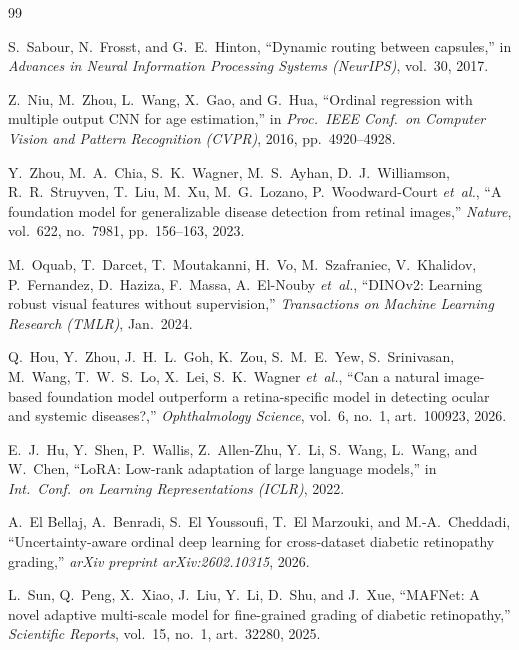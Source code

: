 \documentclass[journal]{IEEEtran}
\begin{document}
\begin{thebibliography}{99}

    S.~Sabour, N.~Frosst, and G.~E.\ Hinton, ``Dynamic routing between capsules,'' in \emph{Advances in Neural Information Processing Systems (NeurIPS)}, vol.\ 30, 2017.

    Z.~Niu, M.~Zhou, L.~Wang, X.~Gao, and G.~Hua, ``Ordinal regression with multiple output CNN for age estimation,'' in \emph{Proc.\ IEEE Conf.\ on Computer Vision and Pattern Recognition (CVPR)}, 2016, pp.\ 4920--4928.

    Y.~Zhou, M.~A.\ Chia, S.~K.\ Wagner, M.~S.\ Ayhan, D.~J.\ Williamson, R.~R.\ Struyven, T.~Liu, M.~Xu, M.~G.\ Lozano, P.~Woodward-Court \emph{et~al.}, ``A foundation model for generalizable disease detection from retinal images,'' \emph{Nature}, vol.\ 622, no.\ 7981, pp.\ 156--163, 2023.

    M.~Oquab, T.~Darcet, T.~Moutakanni, H.~Vo, M.~Szafraniec, V.~Khalidov, P.~Fernandez, D.~Haziza, F.~Massa, A.~El-Nouby \emph{et~al.}, ``DINOv2: Learning robust visual features without supervision,'' \emph{Transactions on Machine Learning Research (TMLR)}, Jan.\ 2024.

    Q.~Hou, Y.~Zhou, J.~H.~L.\ Goh, K.~Zou, S.~M.~E.\ Yew, S.~Srinivasan, M.~Wang, T.~W.~S.\ Lo, X.~Lei, S.~K.\ Wagner \emph{et~al.}, ``Can a natural image-based foundation model outperform a retina-specific model in detecting ocular and systemic diseases?,'' \emph{Ophthalmology Science}, vol.\ 6, no.\ 1, art.\ 100923, 2026.



    E.~J.\ Hu, Y.~Shen, P.~Wallis, Z.~Allen-Zhu, Y.~Li, S.~Wang, L.~Wang, and W.~Chen, ``LoRA: Low-rank adaptation of large language models,'' in \emph{Int.\ Conf.\ on Learning Representations (ICLR)}, 2022.



    A.~El Bellaj, A.~Benradi, S.~El Youssoufi, T.~El Marzouki, and M.-A.\ Cheddadi, ``Uncertainty-aware ordinal deep learning for cross-dataset diabetic retinopathy grading,'' \emph{arXiv preprint arXiv:2602.10315}, 2026.

    L.~Sun, Q.~Peng, X.~Xiao, J.~Liu, Y.~Li, D.~Shu, and J.~Xue, ``MAFNet: A novel adaptive multi-scale model for fine-grained grading of diabetic retinopathy,'' \emph{Scientific Reports}, vol.\ 15, no.\ 1, art.\ 32280, 2025.


\end{thebibliography}
\end{document}

